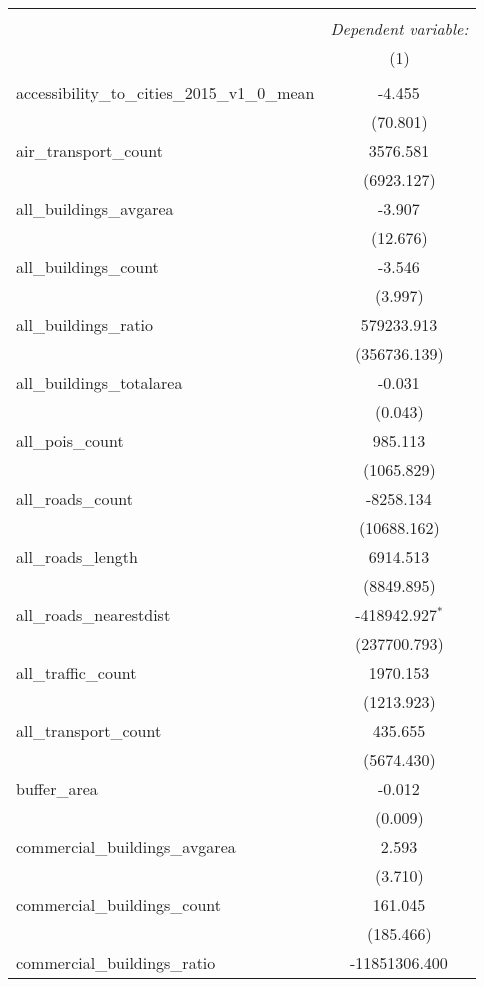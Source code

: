 \begin{table}[!htbp] \centering
\begin{tabular}{@{\extracolsep{5pt}}lc}
\\[-1.8ex]\hline
\hline \\[-1.8ex]
& \multicolumn{1}{c}{\textit{Dependent variable:}} \
\cr \cline{1-2}
\\[-1.8ex] & (1) \\
\hline \\[-1.8ex]
 accessibility_to_cities_2015_v1_0_mean & -4.455$^{}$ \\
  & (70.801) \\
 air_transport_count & 3576.581$^{}$ \\
  & (6923.127) \\
 all_buildings_avgarea & -3.907$^{}$ \\
  & (12.676) \\
 all_buildings_count & -3.546$^{}$ \\
  & (3.997) \\
 all_buildings_ratio & 579233.913$^{}$ \\
  & (356736.139) \\
 all_buildings_totalarea & -0.031$^{}$ \\
  & (0.043) \\
 all_pois_count & 985.113$^{}$ \\
  & (1065.829) \\
 all_roads_count & -8258.134$^{}$ \\
  & (10688.162) \\
 all_roads_length & 6914.513$^{}$ \\
  & (8849.895) \\
 all_roads_nearestdist & -418942.927$^{*}$ \\
  & (237700.793) \\
 all_traffic_count & 1970.153$^{}$ \\
  & (1213.923) \\
 all_transport_count & 435.655$^{}$ \\
  & (5674.430) \\
 buffer_area & -0.012$^{}$ \\
  & (0.009) \\
 commercial_buildings_avgarea & 2.593$^{}$ \\
  & (3.710) \\
 commercial_buildings_count & 161.045$^{}$ \\
  & (185.466) \\
 commercial_buildings_ratio & -11851306.400$^{}$ \\

\end{tabular}
\end{table}
